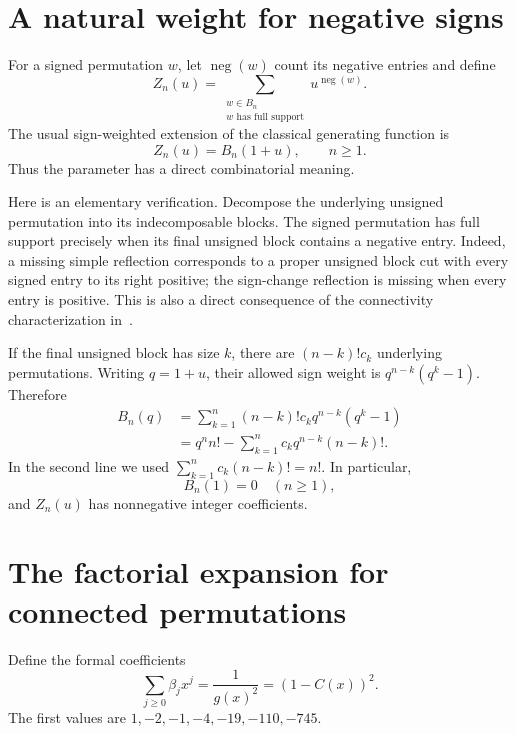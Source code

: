 \documentclass[11pt]{article}
\DeclareMathOperator{\negnum}{neg}
\begin{document}
\section{A natural weight for negative signs}\label{fss:sec:weight}
For a signed permutation $w$, let $\negnum(w)$ count its negative entries and define
\[
 Z_n(u)=\sum_{\substack{w\in B_n\\w\text{ has full support}}}u^{\negnum(w)}.
\]
The usual sign-weighted extension of the classical generating function is
\begin{equation}\label{fss:eq:weighted}
 Z_n(u)=B_n(1+u),\qquad n\ge1.
\end{equation}
Thus the parameter has a direct combinatorial meaning.

Here is an elementary verification. Decompose the underlying unsigned permutation into its indecomposable blocks. The signed permutation has full support precisely when its final unsigned block contains a negative entry. Indeed, a missing simple reflection corresponds to a proper unsigned block cut with every signed entry to its right positive; the sign-change reflection is missing when every entry is positive. This is also a direct consequence of the connectivity characterization in~\cite[Proposition 23]{BHZ}.

If the final unsigned block has size $k$, there are $(n-k)!c_k$ underlying permutations. Writing $q=1+u$, their allowed sign weight is $q^{n-k}(q^k-1)$. Therefore
\begin{align}\label{fss:eq:positive}
 B_n(q)&=\sum_{k=1}^n(n-k)!c_kq^{n-k}(q^k-1)\\
 &=q^nn!-\sum_{k=1}^nc_kq^{n-k}(n-k)! .\label{fss:eq:exact}
\end{align}
In the second line we used $\sum_{k=1}^nc_k(n-k)!=n!$. In particular,
\begin{equation}\label{fss:eq:zero}
 B_n(1)=0\quad(n\ge1),
\end{equation}
and $Z_n(u)$ has nonnegative integer coefficients.

\section{The factorial expansion for connected permutations}\label{fss:sec:factorial}
Define the formal coefficients
\begin{equation}\label{fss:eq:beta}
 \sum_{j\ge0}\beta_jx^j=\frac1{g(x)^2}=(1-C(x))^2.
\end{equation}
The first values are $1,-2,-1,-4,-19,-110,-745$.
\end{document}
